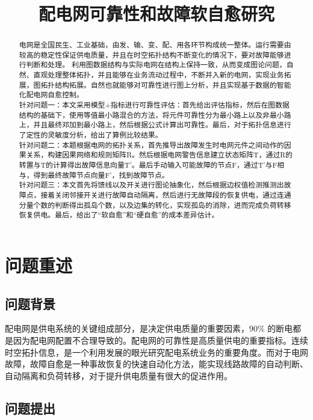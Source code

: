 \documentclass[withoutpreface,bwprint]{cumcmthesis} %
\title{配电网可靠性和故障软自愈研究}
\begin{document}
\maketitle

\begin{abstract}
    电网是全国民生、工业基础，由发、输、变、配、用各环节构成统一整体。运行需要由较高的稳定性保证供电质量，并且在时空拓扑结构不断变化的情况下，要对故障能够进行判断和处理。 利用图数据结构与实际电网在结构上保持一致，从而变成图论问题，自然、直观处理整体拓扑，并且能够在业务流动过程中，不断并入新的电网，实现业务拓展，图拓扑结构拓展。自然也就能够对可靠性进行图上分析，并且实现基于数据的智能化配电网自愈控制。\\
    \indent 针对问题一：本文采用模型+指标进行可靠性评估：首先给出评估指标，然后在图数据结构的基础下，使用等值最小路混合的方法，将元件可靠性分为最小路上以及非最小路上，并且最终邓加到最小路上，然后根据公式计算出可靠性。最后，对于拓扑信息进行了定性的灵敏度分析，给出了算例比较结果。\\
    \indent 针对问题二：本题根据电网的拓扑关系，首先推导出故障发生时电网元件之间动作的因果关系，构建因果网络和规则矩阵R。然后根据电网警告信息建立状态矩阵T，通过R的转置与T的计算得出故障信息向量T'。最后手动输入可能故障的节点F，通过T'与F相与，得到最终故障节点向量F'，找到故障节点。\\
    \indent 针对问题三：本文首先将馈线以及开关进行图论抽象化，然后根据边权值检测推测出故障点，接着关闭邻接开关进行故障自动隔离，然后进行无故障段的恢复供电，通过连通分量个数的判断得出孤岛个数，以及边集的转化，实现孤岛的消除，进而完成负荷转移恢复供电。最后，给出了“软自愈”和“硬自愈”的成本差异估计。
\end{abstract}

\section{问题重述}
\subsection{问题背景}
配电网是供电系统的关键组成部分，是决定供电质量的重要因素，$90\%$
的断电都是因为配电网配置不合理导致的。配电网的可靠性是高质量供电的重要指标。连续时空拓扑信息，是一个利用发展的眼光研究配电系统业务的重要角度。而对于电网故障，故障自愈是一种事故恢复的快速自动化方法，能实现线路故障的自动判断、自动隔离和负荷转移，对于提升供电质量有很大的促进作用。
\subsection{问题提出}
\end{document}
